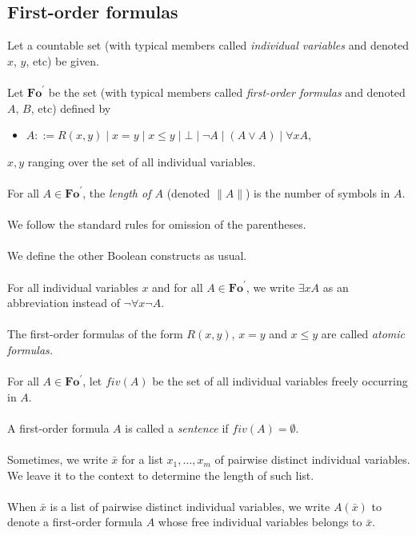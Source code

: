 \documentclass[draft]{article}
\def\Fo{\mathbf{Fo}}
\begin{document}
\subsection{First-order formulas}
%
%
Let a countable set (with typical members called {\em individual variables}\/ and denoted $x$, $y$, etc) be given.
%
%
\\
\\
%
%
Let $\Fo^{\prime}$ be the set (with typical members called {\em first-order formulas}\/ and denoted $A$, $B$, etc) defined by
%
%
\begin{itemize}
%
%
\item $A::=R(x,y){\mid}x{=}y{\mid}x{\leq}y{\mid}{\bot}{\mid}{\neg}A{\mid}(A{\vee}A){\mid}{\forall x}A$,
%
%
\end{itemize}
%
%
$x,y$ ranging over the set of all individual variables.
%
%
\\
\\
%
%
For all $A{\in}\Fo^{\prime}$, the {\em length of $A$}\/ (denoted ${\parallel}A{\parallel}$) is the number of symbols in $A$.
%
%
\\
\\
%
%
We follow the standard rules for omission of the parentheses.
%
%
\\
\\
%
%
We define the other Boolean constructs as usual.
%
%
\\
\\
%
%
For all individual variables $x$ and for all $A{\in}\Fo^{\prime}$, we write ${\exists x}A$ as an abbreviation instead of ${\neg}{\forall x}{\neg}A$.
%
%
\\
\\
%
%
The first-order formulas of the form $R(x,y)$, $x{=}y$ and $x{\leq}y$ are called {\em atomic formulas.}
%
%
\\
\\
%
%
For all $A{\in}\Fo^{\prime}$, let $fiv(A)$ be the set of all individual variables freely occurring in $A$.
%
%
\\
\\
%
%
A first-order formula $A$ is called a {\em sentence}\/ if $fiv(A){=}\emptyset$.
%
%
\\
\\
%
%
Sometimes, we write $\bar{x}$ for a list $x_{1},\ldots,x_{m}$ of pairwise distinct individual variables.
We leave it to the context to determine the length of such list.
%
%
\\
\\
%
%
When $\bar{x}$ is a list of pairwise distinct individual variables, we write $A(\bar{x})$ to denote a first-order formula $A$ whose free individual variables belongs to $\bar{x}$.
\end{document}
